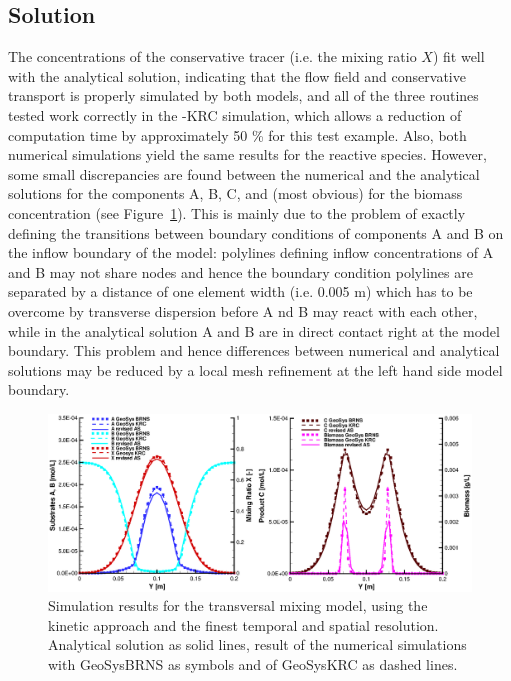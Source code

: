 \subsection{Solution}
The concentrations of the conservative tracer (i.e. the mixing ratio $X$) fit well with the analytical solution, indicating that the flow field and conservative transport is properly simulated by both models, and all of the three routines tested work correctly in the \GeoSys-KRC simulation, which allows a reduction of computation time by approximately 50 \% for this test example. Also, both numerical simulations yield the same results for the reactive species. However, some small discrepancies are found between the numerical and the analytical solutions for the components A, B, C, and (most obvious) for the biomass concentration (see Figure~\ref{fig:monod2d_tss2m}). This is mainly due to the problem of exactly defining the transitions between boundary conditions of components A and B on the inflow boundary of the model: polylines defining inflow concentrations of A and B may not share nodes and hence the boundary condition polylines are separated by a distance of one element width (i.e. 0.005 m) which has to be overcome by transverse dispersion before A nd B may react with each other, while in the analytical solution A and B are in direct contact right at the model boundary. This problem and hence differences between numerical and analytical solutions may be reduced by a local mesh refinement at the left hand side model boundary.

\begin{figure}[!htb]
  \begin{center}
  \includegraphics[scale=0.5]{PART_III/HC/monod_2d_brns_gs_as.eps}
  \end{center}
  \caption{Simulation results for the transversal mixing model, using the
  kinetic approach and the finest temporal and spatial resolution. Analytical
  solution as solid lines, result of the numerical simulations with GeoSysBRNS as symbols and of GeoSysKRC as dashed lines.}
  \label{fig:monod2d_tss2m}
\end{figure}



